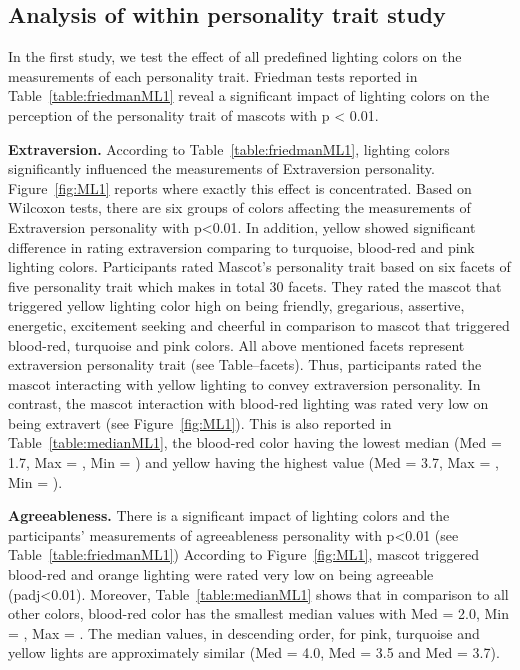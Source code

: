 \subsection{Analysis of within personality trait study}
\label{subsec:MLstudy1}
In the first study, we test the effect of all predefined lighting colors on the measurements of each personality trait.
Friedman tests reported in Table~\ref{table:friedmanML1} reveal a significant impact of lighting colors on the perception
of the personality trait of mascots with p < 0.01.

\par\textbf{Extraversion.}
According to Table~\ref{table:friedmanML1}, lighting colors significantly
influenced the measurements of Extraversion personality.
Figure~\ref{fig:ML1} reports where exactly this effect is concentrated.
Based on Wilcoxon tests, there are six groups of colors affecting the
measurements of Extraversion personality with p<0.01.
In addition, yellow showed significant difference in rating extraversion
comparing to turquoise, blood-red and pink lighting colors.
Participants rated Mascot's personality trait based on six facets of five
personality trait which makes in total 30 facets.
They rated the mascot that triggered yellow lighting color high on being
friendly, gregarious, assertive, energetic, excitement seeking and
cheerful in comparison to mascot that triggered blood-red, turquoise and pink colors.
All above mentioned facets represent extraversion personality trait (see Table--facets).
Thus, participants rated the mascot interacting with yellow lighting to convey extraversion personality.
In contrast, the mascot interaction with blood-red lighting was
rated very low on being extravert (see Figure~\ref{fig:ML1}).
This is also reported in Table~\ref{table:medianML1}, the blood-red color having
the lowest median (Med = 1.7, Max = , Min = ) and yellow having the highest
value (Med = 3.7, Max = , Min = ).

\par\textbf{Agreeableness.}
There is a significant impact of lighting colors and the participants'
measurements of agreeableness personality with p<0.01 (see Table~\ref{table:friedmanML1})
According to Figure~\ref{fig:ML1}, mascot triggered blood-red and orange lighting
were rated very low on being agreeable (padj<0.01).
Moreover, Table~\ref{table:medianML1} shows that in comparison to all other colors,
blood-red color has the smallest median values with Med = 2.0, Min = , Max = .
The median values, in descending order, for pink, turquoise and yellow lights are
approximately similar (Med = 4.0, Med = 3.5 and Med = 3.7).

